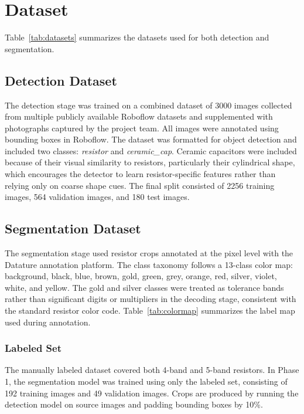 \documentclass[conference]{IEEEtran}
\begin{document}
 
\section{Dataset}
\label{sec:datasets}

Table~\ref{tab:datasets} summarizes the datasets used for both detection and segmentation.

\subsection{Detection Dataset}
The detection stage was trained on a combined dataset of 3000 images collected from multiple publicly available Roboflow datasets and supplemented with photographs captured by the project team. All images were annotated using bounding boxes in Roboflow. The dataset was formatted for object detection and included two classes: \textit{resistor} \cite{resistor-band-dectection_dataset,resistors-7wdzf_dataset,resistors-dooos_dataset} and \textit{ceramic\_cap}. Ceramic capacitors were included because of their visual similarity to resistors, particularly their cylindrical shape, which encourages the detector to learn resistor-specific features rather than relying only on coarse shape cues. The final split consisted of 2256 training images, 564 validation images, and 180 test images.

\subsection{Segmentation Dataset}

The segmentation stage used resistor crops annotated at the pixel level with the Datature annotation platform. The class taxonomy follows a 13-class color map: background, black, blue, brown, gold, green, grey, orange, red, silver, violet, white, and yellow. The gold and silver classes were treated as tolerance bands rather than significant digits or multipliers in the decoding stage, consistent with the standard resistor color code. Table~\ref{tab:colormap} summarizes the label map used during annotation. 

\subsubsection{Labeled Set} 
The manually labeled dataset covered both 4-band and 5-band resistors. In Phase 1, the segmentation model was trained using only the labeled set, consisting of 192 training images and 49 validation images. Crops are produced by running the detection model on source images and padding bounding boxes by 10\%. 
\end{document}
